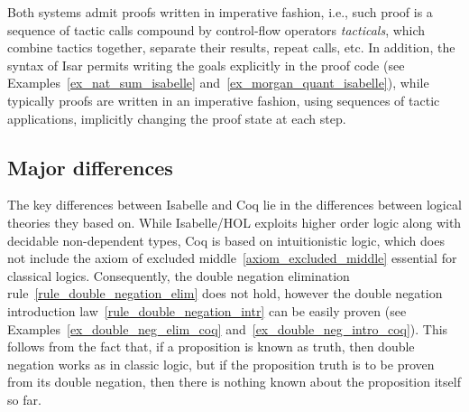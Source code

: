 \documentclass[article]{aaltoseries}
\begin{document}
Both systems admit proofs written in imperative fashion, i.e., such proof is a sequence of tactic calls compound by control-flow operators \textit{tacticals}, which combine tactics together, separate their results, repeat calls, etc. In addition, the syntax of Isar permits writing the goals explicitly in the proof code (see Examples~\ref{ex_nat_sum_isabelle} and~\ref{ex_morgan_quant_isabelle}), while typically proofs are written in an imperative fashion, using sequences of tactic applications, implicitly changing the proof state at each step.



\subsection{Major differences}

The key differences between Isabelle and Coq lie in the differences between logical theories they based on. While Isabelle/HOL exploits higher order logic along with decidable non-dependent types, Coq is based on intuitionistic logic, which does not include the axiom of excluded middle~\eqref{axiom_excluded_middle} essential for classical logics.
Consequently, the double negation elimination rule~\eqref{rule_double_negation_elim} does not hold, however the double negation introduction law~\eqref{rule_double_negation_intr} can be easily proven (see Examples~\ref{ex_double_neg_elim_coq} and~\ref{ex_double_neg_intro_coq}). This follows from the fact that, if a proposition is known as truth, then double negation works as in classic logic, but if the proposition truth is to be proven from its double negation, then there is nothing known about the proposition itself so far.
\end{document}
